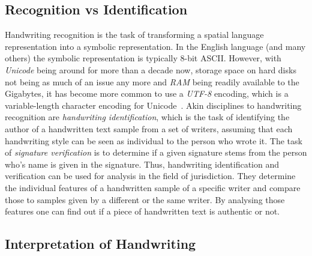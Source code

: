 
\subsection{Recognition vs Identification}
\label{sec:recognitionvsidentification}

Handwriting recognition is the task of transforming a spatial language 
representation into a symbolic representation. In the English language
(and many others) the symbolic representation is typically 8-bit ASCII.
However, with \emph{Unicode} being around for more than a decade now,
storage space on hard disks not being as much of an issue any more and
\emph{RAM} being readily available to the Gigabytes, it has become more 
common to use a \emph{UTF-8}  encoding, which is a variable-length character 
encoding for Unicode~.
Akin disciplines to handwriting recognition are 
\emph{handwriting identification}, which is the task of identifying the author
of a handwritten text sample from a set of writers, assuming that each
handwriting style can be seen as individual to the person who wrote it.
The task of \emph{signature verification} is to determine if a given signature
stems from the person who's name is given in the signature.
Thus, handwriting identification and verification can be used for 
analysis in the field of jurisdiction. They determine the individual features
of a handwritten sample of a specific writer and compare those
to samples given by a different or the same writer. By analysing those 
features one can find out if a piece of handwritten text is authentic or not.

\subsection{Interpretation of Handwriting}
\label{sec:interpretationofhandwriting}

